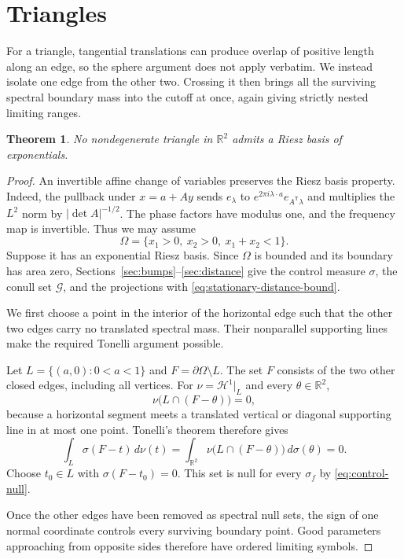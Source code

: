 \documentclass[a4paper,12pt,reqno]{amsart}
\newcommand{\lead}[1]{\par\smallskip\noindent\leavevmode#1\par\smallskip}
\newtheorem{theorem}{Theorem}[section]
\theoremstyle{remark}
\numberwithin{equation}{section}
\newcommand{\R}{\mathbb R}
\begin{document}
\section{Triangles}\label{sec:triangles}

\lead{For a triangle, tangential translations can produce overlap of
positive length along an edge, so the sphere argument does not apply
verbatim. We instead isolate one edge from the other two. Crossing it
then brings all the surviving spectral boundary mass into the cutoff
at once, again giving strictly nested limiting ranges.}


\begin{theorem}\label{thm:triangle}
No nondegenerate triangle in $\R^2$ admits a Riesz basis of exponentials.
\end{theorem}

\begin{proof}
An invertible affine change of variables preserves the Riesz basis
property. Indeed, the pullback under $x=a+Ay$ sends
$e_\lambda$ to $e^{2\pi i\lambda\cdot a}e_{A^{\mathsf T}\lambda}$
and multiplies the $L^2$ norm by $|\det A|^{-1/2}$. The phase factors
have modulus one, and the frequency map is invertible. Thus we may assume
\[
 \Omega=\{x_1>0,\ x_2>0,\ x_1+x_2<1\}.
\]
Suppose it has an exponential Riesz basis. Since $\Omega$ is bounded
and its boundary has area zero, Sections~\ref{sec:bumps}--\ref{sec:distance}
give the control measure $\sigma$, the conull set $\mathcal G$,
and the projections with \eqref{eq:stationary-distance-bound}.

\lead{We first choose a point in the interior of the horizontal edge such
that the other two edges carry no translated spectral mass. Their
nonparallel supporting lines make the required Tonelli argument possible.}


Let $L=\{(a,0):0<a<1\}$ and $F=\partial\Omega\setminus L$.
The set $F$ consists of the two other closed edges, including all
vertices. For $\nu=\mathcal H^1|_L$ and every $\theta\in\R^2$,
\[
 \nu\bigl(L\cap(F-\theta)\bigr)=0,
\]
because a horizontal segment meets a translated vertical or diagonal
supporting line in at most one point. Tonelli's theorem therefore gives
\[
 \int_L\sigma(F-t)\,d\nu(t)
 =\int_{\R^2}\nu\bigl(L\cap(F-\theta)\bigr)\,d\sigma(\theta)=0.
\]
Choose $t_0\in L$ with $\sigma(F-t_0)=0$. This set is null for every
$\sigma_f$ by \eqref{eq:control-null}.

\lead{Once the other edges have been removed as spectral null sets, the
sign of one normal coordinate controls every surviving boundary point.
Good parameters approaching from opposite sides therefore have ordered
limiting symbols.}



\end{proof}
\end{document}
